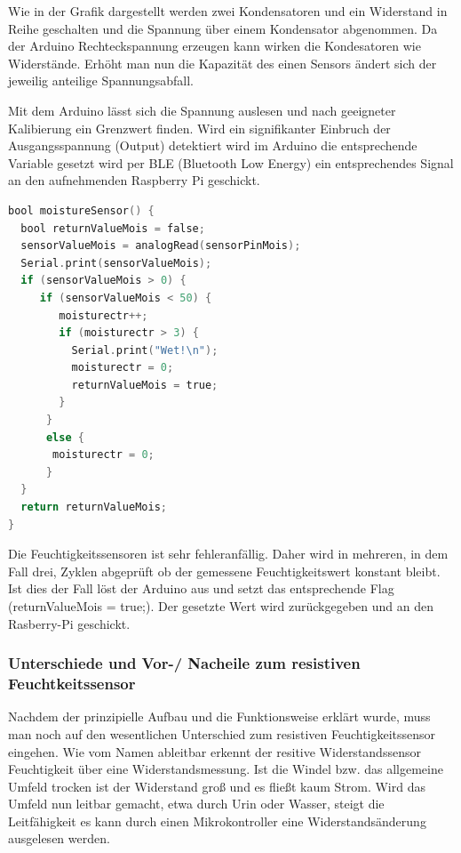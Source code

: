 Wie in der Grafik dargestellt werden zwei Kondensatoren und ein Widerstand in Reihe geschalten und die Spannung über einem Kondensator abgenommen. Da der Arduino Rechteckspannung erzeugen kann wirken die Kondesatoren wie Widerstände. Erhöht man nun die Kapazität des einen Sensors ändert sich der jeweilig anteilige Spannungsabfall.

Mit dem Arduino lässt sich die Spannung auslesen und nach geeigneter Kalibierung ein Grenzwert finden. Wird ein signifikanter Einbruch der Ausgangsspannung (Output) detektiert wird im Arduino die entsprechende Variable gesetzt wird per BLE (Bluetooth Low Energy) ein entsprechendes Signal an den aufnehmenden Raspberry Pi geschickt.

\begin{lstlisting}[language=C, caption=Feuchtigkeitsdetektion im Arduino]
bool moistureSensor() {
  bool returnValueMois = false;
  sensorValueMois = analogRead(sensorPinMois);
  Serial.print(sensorValueMois);
  if (sensorValueMois > 0) {
     if (sensorValueMois < 50) {
        moisturectr++;
        if (moisturectr > 3) {
          Serial.print("Wet!\n");
          moisturectr = 0;
          returnValueMois = true;
        }
      }
      else {
       moisturectr = 0;
      }
  }
  return returnValueMois;
}
\end{lstlisting}

Die Feuchtigkeitssensoren ist sehr fehleranfällig. Daher wird in mehreren, in dem Fall drei, Zyklen abgeprüft ob der gemessene Feuchtigkeitswert konstant bleibt. Ist dies der Fall löst der Arduino aus und setzt das entsprechende Flag (\glqq{}returnValueMois = true;\grqq{}). Der gesetzte Wert wird zurückgegeben und an den Rasberry-Pi geschickt. 
 
\subsubsection{Unterschiede und Vor-/ Nacheile zum resistiven Feuchtkeitssensor}
Nachdem der prinzipielle Aufbau und die Funktionsweise erklärt wurde, muss man noch auf den wesentlichen Unterschied zum resistiven Feuchtigkeitssensor eingehen. Wie vom Namen ableitbar erkennt der resitive Widerstandssensor Feuchtigkeit über eine Widerstandsmessung. Ist die Windel bzw. das allgemeine Umfeld trocken ist der Widerstand groß und es fließt kaum Strom. Wird das Umfeld nun leitbar gemacht, etwa durch Urin oder Wasser, steigt die Leitfähigkeit es kann durch einen Mikrokontroller eine Widerstandsänderung ausgelesen werden. 

